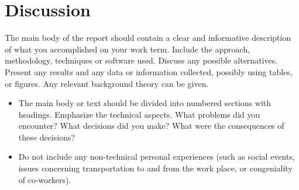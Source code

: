 \section{Discussion}

The main body of the report should contain a clear and informative description of what you accomplished on your work term. Include the approach, methodology, techniques or software used. Discuss any possible alternatives. Present any results and any data or information collected, possibly using tables, or figures. Any relevant background theory can be given.

\begin{itemize}
  \item The main body or text should be divided into numbered sections with headings. Emphasize the technical aspects. What problems did you encounter? What decisions did you make? What were the consequences of these decisions?
  \item Do not include any non-technical personal experiences (such as social events, issues concerning transportation to and from the work place, or congeniality of co-workers).
\end{itemize}










